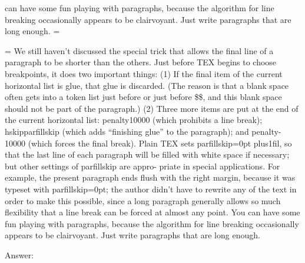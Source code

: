 can have some fun playing with paragraphs, because the algorithm for line breaking
occasionally appears to be clairvoyant. Just write paragraphs that are long enough.
=\hangafter
\par
\hangindent=-40pt \hangafter=
We still haven’t discussed the special trick that allows the final line of a paragraph 
to be shorter than the others. Just before TEX begins to choose breakpoints, 
it does two important things: (1) If the final item of the current horizontal
list is glue, that glue is discarded. (The reason is that a blank space often gets into a
token list just before or just before \$\$, and this blank space should not be part
of the paragraph.) (2) Three more items are put at the end of the current horizontal
list: penalty10000 (which prohibits a line break); hskipparfillskip (which adds
“finishing glue” to the paragraph); and penalty-10000 (which forces the final break).
Plain TEX sets parfillskip=0pt plus1fil, so that the last line of each paragraph will
be filled with white space if necessary; but other settings of parfillskip are appro-
priate in special applications. For example, the present paragraph ends flush with the
right margin, because it was typeset with parfillskip=0pt; the author didn’t have to
rewrite any of the text in order to make this possible, since a long paragraph generally
allows so much flexibility that a line break can be forced at almost any point. You
can have some fun playing with paragraphs, because the algorithm for line breaking
occasionally appears to be clairvoyant. Just write paragraphs that are long enough.

Answer:

